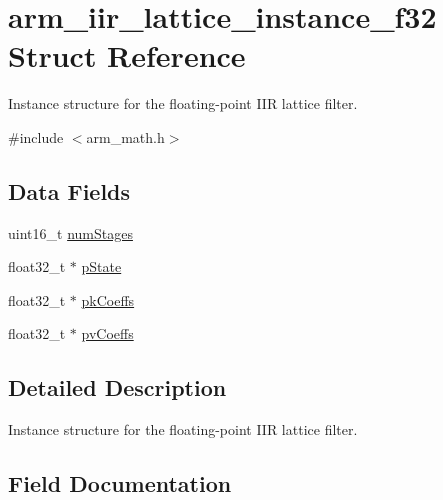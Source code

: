 \hypertarget{structarm__iir__lattice__instance__f32}{}\section{arm\+\_\+iir\+\_\+lattice\+\_\+instance\+\_\+f32 Struct Reference}
\label{structarm__iir__lattice__instance__f32}


Instance structure for the floating-\/point I\+IR lattice filter.  




{\ttfamily \#include $<$arm\+\_\+math.\+h$>$}

\subsection*{Data Fields}
\begin{DoxyCompactItemize}
\item 
uint16\+\_\+t \hyperlink{structarm__iir__lattice__instance__f32_a4cceb90547b3e585d4c7aabaa8057212}{num\+Stages}
\item 
float32\+\_\+t $\ast$ \hyperlink{structarm__iir__lattice__instance__f32_a335c87e6fdc4b96601d95a5de8b9c463}{p\+State}
\item 
float32\+\_\+t $\ast$ \hyperlink{structarm__iir__lattice__instance__f32_a994889c5c4a866c50a0ee63326378816}{pk\+Coeffs}
\item 
float32\+\_\+t $\ast$ \hyperlink{structarm__iir__lattice__instance__f32_a0f8815744fade9c580d44277ff802308}{pv\+Coeffs}
\end{DoxyCompactItemize}


\subsection{Detailed Description}
Instance structure for the floating-\/point I\+IR lattice filter. 

\subsection{Field Documentation}
\mbox{\label{structarm__iir__lattice__instance__f32_a4cceb90547b3e585d4c7aabaa8057212}} 
